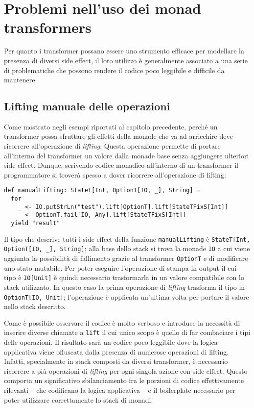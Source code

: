 \section{Problemi nell'uso dei monad transformers}

Per quanto i transformer possano essere uno strumento efficace per modellare la presenza di diversi side effect, il loro utilizzo è generalmente associato a una serie di problematiche che possono rendere il codice poco leggibile e difficile da mantenere.

\subsection{Lifting manuale delle operazioni}
Come mostrato negli esempi riportati al capitolo precedente, perché un transformer possa sfruttare gli effetti della monade che va ad arricchire deve ricorrere all'operazione di \emph{lifting}. Questa operazione permette di portare all'interno del transformer un valore dalla monade base senza aggiungere ulteriori side effect.
Dunque, scrivendo codice monadico all'interno di un transformer il programmatore si troverà spesso a dover ricorrere all'operazione di lifting:
\begin{lstlisting}[language=scala3]
def manualLifting: StateT[Int, OptionT[IO, _], String] =
  for
    _ <- IO.putStrLn("test").lift[OptionT].lift[StateTFixS[Int]]
    _ <- OptionT.fail[IO, Any].lift[StateTFixS[Int]]
  yield "result"
\end{lstlisting}
Il tipo che descrive tutti i side effect della funzione \lstinline{manualLifting} è \lstinline{StateT[Int, OptionT[IO, _], String]}; alla base dello stack si trova la monade \lstinline{IO} a cui viene aggiunta la possibilità di fallimento grazie al transformer \lstinline{OptionT} e di modificare uno stato mutabile.
Per poter eseguire l'operazione di stampa in output il cui tipo è \lstinline{IO[Unit]} è quindi necessario trasformarla in un valore compatibile con lo stack utilizzato. In questo caso la prima operazione di \emph{lifting} trasforma il tipo in \lstinline{OptionT[IO, Unit]}; l'operazione è applicata un'ultima volta per portare il valore nello stack descritto.

Come è possibile osservare il codice è molto verboso e introduce la necessità di inserire diverse chiamate a \lstinline{lift} il cui unico scopo è quello di far combaciare i tipi delle operazioni.
Il risultato sarà un codice poco leggibile dove la logica applicativa viene offuscata dalla presenza di numerose operazioni di lifting.
Infatti, specialmente in stack composti da diversi transformer, è necessario ricorrere a più operazioni di \emph{lifting} per ogni singola azione con side effect. Questo comporta un significativo sbilanciamento fra le porzioni di codice effettivamente rilevanti -- che codificano la logica applicativa -- e il boilerplate necessario per poter utilizzare correttamente lo stack di monadi.

